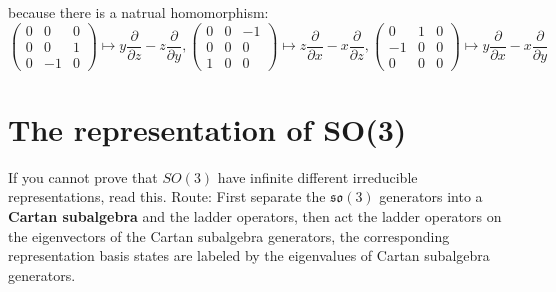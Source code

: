 \documentclass{article}
\begin{document}
	because there is a natrual homomorphism:
	\begin{equation*}
		\begin{pmatrix}
			0 & 0 & 0\\
			0 & 0 & 1\\
			0 & -1 & 0
		\end{pmatrix} \mapsto y\frac{\partial }{\partial z} -z\frac{\partial }{\partial y} ,\begin{pmatrix}
			0 & 0 & -1\\
			0 & 0 & 0\\
			1 & 0 & 0
		\end{pmatrix} \mapsto z\frac{\partial }{\partial x} -x\frac{\partial }{\partial z} ,\begin{pmatrix}
			0 & 1 & 0\\
			-1 & 0 & 0\\
			0 & 0 & 0
		\end{pmatrix} \mapsto y\frac{\partial }{\partial x} -x\frac{\partial }{\partial y}
	\end{equation*}
	
	\section{The representation of SO(3)}
	
	If you cannot prove that $SO( 3)$ have infinite different irreducible representations, read this. Route: First separate the $\mathfrak{so}( 3)$ generators into a \textbf{Cartan subalgebra} and the ladder operators, then act the ladder operators on the eigenvectors of the Cartan subalgebra generators, the corresponding representation basis states are labeled by the eigenvalues of Cartan subalgebra generators. 
	
\end{document}
